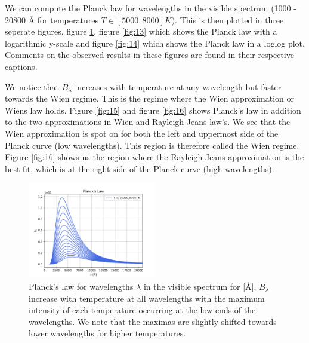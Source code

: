 \documentclass[a4paper,11.5pt,]{article}
\begin{document}
\begin{multicols}{2}
We can compute the Planck law for wavelengths in the visible spectrum (1000 - 20800 Å for temperatures $T \in [5000, 8000] K$). This is then plotted in three seperate figures, figure \ref{fig:12}, figure \ref{fig:13} which shows the Planck law with a logarithmic y-scale and figure \ref{fig:14} which shows the Planck law in a loglog plot. Comments on the observed results in these figures are found in their respective captions. 

We notice that $B_\lambda$ increases with temperature at any wavelength but faster towards the Wien regime. This is the regime where the Wien approximation or Wiens law holds. Figure \ref{fig:15} and figure \ref{fig:16} shows Planck's law in addition to the two approximations in Wien and Rayleigh-Jeans law's. We see that the Wien approximation is spot on for both the left and uppermost side of the Planck curve (low wavelengths). This region is therefore called the Wien regime. Figure \ref{fig:16} shows us the region where the Rayleigh-Jeans approximation is the best fit, which is at the right side of the Planck curve (high wavelengths). 
 


\begin{figure}[H]
	\centering
	\includegraphics[width=0.5\textwidth]{SSA/figures/planck.pdf}
	\caption{Planck's law for wavelengths $\lambda$ in the visible spectrum for [Å]. $B_\lambda$ increase with temperature at all wavelengths with the maximum intensity of each temperature occurring at the low ends of the wavelengths. We note that the maximas are slightly shifted towards lower wavelengths for higher temperatures. }
	\label{fig:12}
\end{figure}




\end{multicols}
\end{document}
